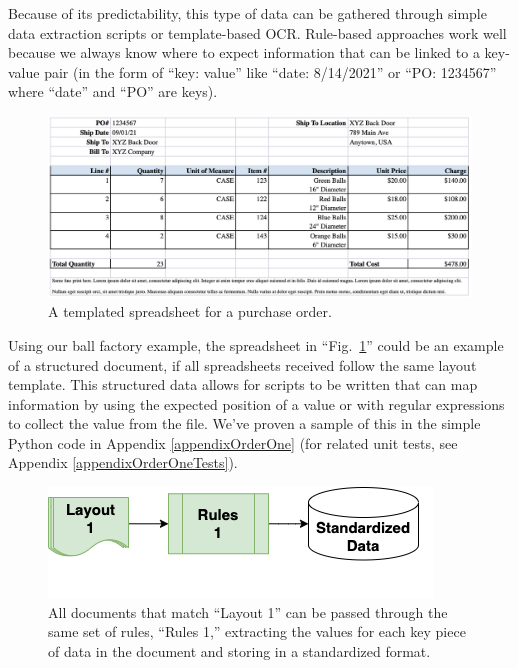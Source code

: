 \documentclass[conference]{IEEEtran}
\begin{document}
Because of its predictability, this type of data can be gathered through simple data extraction scripts or template-based OCR. Rule-based approaches work well because we always know where to expect information that can be linked to a key-value pair (in the form of ``key: value'' like ``date: 8/14/2021'' or ``PO: 1234567'' where ``date'' and ``PO'' are keys).

\begin{figure}[ht]
\centerline{\includegraphics[width=\columnwidth]{Spreadsheet1.png}}
\caption{A templated spreadsheet for a purchase order.}
\label{figSpreadsheet1}
\end{figure}

Using our ball factory example, the spreadsheet in ``Fig.~\ref{figSpreadsheet1}'' could be an example of a structured document, if all spreadsheets received follow the same layout template. This structured data allows for scripts to be written that can map information by using the expected position of a value or with regular expressions to collect the value from the file. We've proven a sample of this in the simple Python code in Appendix \ref{appendixOrderOne} (for related unit tests, see Appendix \ref{appendixOrderOneTests}).

\begin{figure}[ht]
\centerline{\includegraphics[width=\columnwidth]{RulesFlow1.png}}
\caption{All documents that match ``Layout 1'' can be passed through the same set of rules, ``Rules 1,'' extracting the values for each key piece of data in the document and storing in a standardized format.}
\label{figRulesFlow1}
\end{figure}
\end{document}
